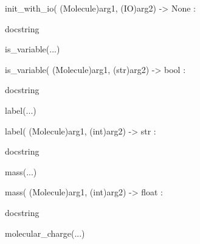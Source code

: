 \documentclass[letterpaper,10pt,english]{sphinxmanual}
\begin{document}
\begin{description}
\begin{description}
\begin{DUlineblock}{0em}
\item[]
\begin{DUlineblock}{\DUlineblockindent}
\item[] init\_with\_io( (Molecule)arg1, (IO)arg2) -\textgreater{} None :
\item[]
\begin{DUlineblock}{\DUlineblockindent}
\item[] docstring
\item[] 
\end{DUlineblock}
\end{DUlineblock}
\item[] is\_variable(...)
\item[]
\begin{DUlineblock}{\DUlineblockindent}
\item[] is\_variable( (Molecule)arg1, (str)arg2) -\textgreater{} bool :
\item[]
\begin{DUlineblock}{\DUlineblockindent}
\item[] docstring
\item[] 
\end{DUlineblock}
\end{DUlineblock}
\item[] label(...)
\item[]
\begin{DUlineblock}{\DUlineblockindent}
\item[] label( (Molecule)arg1, (int)arg2) -\textgreater{} str :
\item[]
\begin{DUlineblock}{\DUlineblockindent}
\item[] docstring
\item[] 
\end{DUlineblock}
\end{DUlineblock}
\item[] mass(...)
\item[]
\begin{DUlineblock}{\DUlineblockindent}
\item[] mass( (Molecule)arg1, (int)arg2) -\textgreater{} float :
\item[]
\begin{DUlineblock}{\DUlineblockindent}
\item[] docstring
\item[] 
\end{DUlineblock}
\end{DUlineblock}
\item[] molecular\_charge(...)

\end{DUlineblock}
\end{description}
\end{description}
\end{document}
